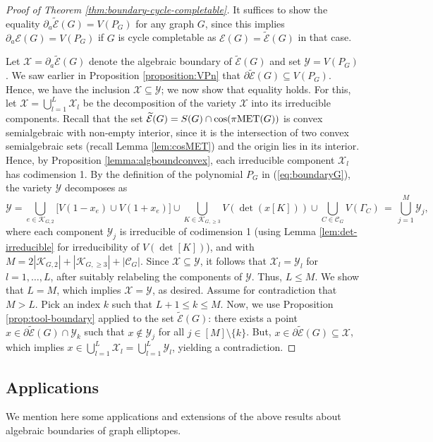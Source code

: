 \documentclass[a4paper, 11pt, twoside]{article}
\newcommand{\ME}{{\mathcal E}}
\newcommand{\MX}{{\mathcal X}}
\newcommand{\MY}{{\mathcal Y}}
\newcommand{\MET}{\text{\rm MET}}
\newcommand{\MK}{{\mathcal K}}
\newcommand{\MC}{{\mathcal C}}
\newcommand{\tME}{\widetilde \ME}
\theoremstyle{plain}
\begin{document}
\begin{proof}[Proof of Theorem \ref{thm:boundary-cycle-completable}]
It suffices  to show the equality $\partial_a\tME(G)=V(P_G)$ for any graph $G$, since this implies $\partial_a\ME(G)=V(P_G)$ if $G$ is cycle completable as $\ME(G)=\tME(G)$ in that case.

Let $\MX=\partial_a \tME(G)$ denote
 the algebraic boundary of $\tME(G)$ and set 
$\MY=V(P_G)$. We saw earlier in Proposition \ref{proposition:VPn} that $\partial \tME(G)\subseteq V(P_G)$. Hence, we have the inclusion $\MX\subseteq \MY$; we  now show that equality holds.
For this, let  $\MX=\bigcup_{l=1}^L \MX_l$ be the decomposition of the variety $\MX$ into its  irreducible components. 
Recall that the  set $\tME(G)=S(G)\cap \cos(\pi\MET(G))$ is convex semialgebraic with non-empty interior, since it is the intersection of two convex semialgebraic sets (recall Lemma \ref{lem:cosMET}) and the origin lies in its interior.
Hence, by Proposition \ref{lemma:algboundconvex}, each irreducible component $\MX_l$ has codimension 1. By the definition of the polynomial $P_G$ in (\ref{eq:boundaryG}), the variety $\MY$ decomposes as
$$\MY=\bigcup_{ e\in \MK_{G,2}} \Big [ V(1-x_e) \cup V(1+x_e) \big ] \cup \bigcup_{K\in \MK_{G,\ge 3}} V(\det (x[K])) \cup \bigcup_{C\in \MC_G} V(\Gamma_C) \, = \, \bigcup_{j=1}^M \MY_j,
$$
where each component $\MY_j$ is irreducible of codimension 1 (using Lemma \ref{lem:det-irreducible} for irreducibility of $V(\det[K])$), and with  $M=2|\MK_{G,2}|+|\MK_{G,\ge 3}| + |\MC_G|$. Since $\MX\subseteq \MY$, it follows that $\MX_l=\MY_ l$ for $l=1,\ldots,L$, after suitably relabeling the components of $\MY$. 
Thus, $L\le M$. We show that $L=M$, which implies $\MX=\MY$, as desired. Assume for contradiction that $M>L$. Pick an index $k$ such that $L+1\le k\le M$. Now, we use   Proposition \ref{prop:tool-boundary} applied to the set $\tME(G)$: there exists a point $x\in \partial \tME(G) \cap \MY_k$ such that $x\not\in \MY_j$ for all $j\in [M]\setminus \{k\}$.   But, $x\in \partial \tME(G) \subseteq \MX$, which implies $x\in \bigcup_{l=1}^L\MX_l=\bigcup_{l=1}^L \MY_l$, yielding a contradiction.
\end{proof}


\subsection{Applications}\label{sec:applications}
We mention here some  applications and extensions of the above results about algebraic boundaries of graph elliptopes. 
\end{document}
